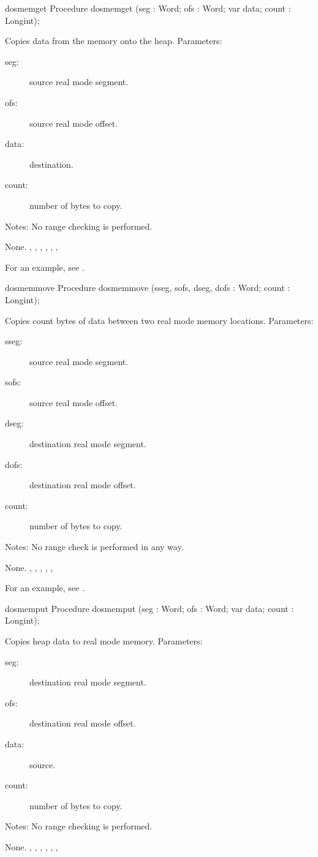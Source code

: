 \begin{procedure}{dosmemget}
\Declaration
Procedure dosmemget (seg : Word; ofs : Word; var data; count : Longint);

\Description
Copies data from the \dos memory onto the heap.
Parameters:
\begin{description}
\item[seg:\ ] source real mode segment.
\item[ofs:\ ] source real mode offset.
\item[data:\ ] destination. 
\item[count:\ ] number of bytes to copy.
\end{description}
Notes: No range checking is performed.

\Errors
 None. 
\SeeAlso
{},
,
,
,
,
, 
\end{procedure}
For an example, see .
\begin{procedure}{dosmemmove}
\Declaration
Procedure dosmemmove (sseg, sofs, dseg, dofs : Word; count : Longint);

\Description
Copies count bytes of data between two \dos real mode memory locations.
Parameters:
\begin{description}
\item[sseg:\ ] source real mode segment. 
\item[sofs:\ ] source real mode offset.
\item[dseg:\ ] destination real mode segment. 
\item[dofs:\ ] destination real mode offset.
\item[count:\ ] number of bytes to copy.
\end{description}
Notes: No range check is performed in any way.

\Errors
 None.
\SeeAlso
{}, 
,
, 
, 
,
\end{procedure}
For an example, see .
\begin{procedure}{dosmemput}
\Declaration
Procedure dosmemput (seg : Word; ofs : Word; var data; count : Longint);

\Description
Copies heap data to \dos real mode memory.
Parameters:
\begin{description}
\item[seg:\ ] destination real mode segment.
\item[ofs:\ ] destination real mode offset. 
\item[data:\ ] source. 
\item[count:\ ] number of bytes to copy.
\end{description}
Notes: No range checking is performed.

\Errors
 None. 
\SeeAlso
{}, 
,
,
,
,
,
\end{procedure}
